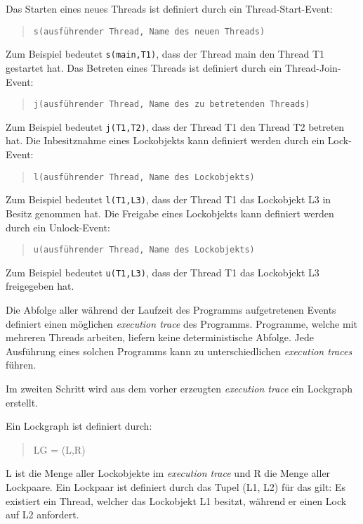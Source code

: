 Das Starten eines neues Threads ist definiert durch ein Thread-Start-Event:
\begin{quote}
\texttt{s(ausführender Thread, Name des neuen Threads)}
\end{quote}
Zum Beispiel bedeutet \texttt{s(main,T1)}, dass der Thread \textrm{main} den
Thread \textrm{T1} gestartet hat. Das Betreten eines Threads ist definiert durch
ein Thread-Join-Event:
\begin{quote}
\texttt{j(ausführender Thread, Name des zu betretenden Threads)}
\end{quote}
Zum Beispiel bedeutet \texttt{j(T1,T2)}, dass der Thread \textrm{T1} den Thread
\textrm{T2} betreten hat. Die Inbesitznahme eines Lockobjekts kann definiert
werden durch ein Lock-Event:
\begin{quote}
\texttt{l(ausführender Thread, Name des Lockobjekts)}
\end{quote}
Zum Beispiel bedeutet \texttt{l(T1,L3)}, dass der Thread \textrm{T1} das
Lockobjekt \textrm{L3} in Besitz genommen hat. Die Freigabe eines Lockobjekts
kann definiert werden durch ein Unlock-Event:
\begin{quote}
\texttt{u(ausführender Thread, Name des Lockobjekts)}
\end{quote}
Zum Beispiel bedeutet \texttt{u(T1,L3)}, dass der Thread \textrm{T1} das
Lockobjekt \textrm{L3} freigegeben hat.

Die Abfolge aller während der Laufzeit des Programms aufgetretenen Events
definiert einen möglichen \emph{execution trace} des Programms. Programme,
welche mit mehreren Threads arbeiten, liefern keine deterministische Abfolge.
Jede Ausführung eines solchen Programms kann zu unterschiedlichen
\emph{execution traces} führen. 

Im zweiten Schritt wird aus dem vorher erzeugten \emph{execution trace} ein
Lockgraph erstellt.

\begin{samepage}
  Ein Lockgraph ist definiert durch:
  \begin{quote}
  \textrm{LG = (L,R)}
  \end{quote}
\end{samepage}
\textrm{L} ist die Menge aller Lockobjekte im \emph{execution trace} und \textrm{R}
die Menge aller Lockpaare. Ein Lockpaar ist definiert durch das Tupel
\textrm{(L1, L2)} für das gilt: Es existiert ein Thread, welcher das Lockobjekt
\textrm{L1} besitzt, während er einen Lock auf \textrm{L2}
anfordert.\cites[vgl.][72]{coffman1971system}[213]{bensalem2005dynamic}

